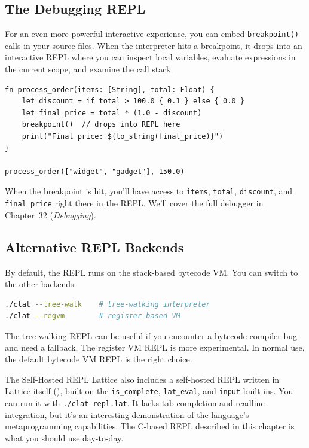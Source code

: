 \subsection{The Debugging REPL}\label{subsec:debug-repl}

For an even more powerful interactive experience, you can embed \lstinline|breakpoint()| calls in your source files.
When the interpreter hits a breakpoint, it drops into an interactive REPL where you can inspect local variables, evaluate expressions in the current scope, and examine the call stack.

\begin{lstlisting}[language=Lattice, caption={Using breakpoint() for in-context debugging}]
fn process_order(items: [String], total: Float) {
    let discount = if total > 100.0 { 0.1 } else { 0.0 }
    let final_price = total * (1.0 - discount)
    breakpoint()  // drops into REPL here
    print("Final price: ${to_string(final_price)}")
}

process_order(["widget", "gadget"], 150.0)
\end{lstlisting}

When the breakpoint is hit, you'll have access to \lstinline|items|, \lstinline|total|, \lstinline|discount|, and \lstinline|final_price| right there in the REPL\@.
We'll cover the full debugger in Chapter~32 (\emph{Debugging}).

\subsection{Alternative REPL Backends}\label{subsec:alt-repls}

By default, the REPL runs on the stack-based bytecode VM\@.
You can switch to the other backends:

\begin{lstlisting}[language=bash, numbers=none]
./clat --tree-walk    # tree-walking interpreter
./clat --regvm        # register-based VM
\end{lstlisting}

The tree-walking REPL can be useful if you encounter a bytecode compiler bug and need a fallback.
The register VM REPL is more experimental.
In normal use, the default bytecode VM REPL is the right choice.

\begin{warnbox}{The Self-Hosted REPL}
Lattice also includes a self-hosted REPL written in Lattice itself (), built on the \lstinline|is_complete|, \lstinline|lat_eval|, and \lstinline|input| built-ins.
You can run it with \lstinline|./clat repl.lat|.
It lacks tab completion and readline integration, but it's an interesting demonstration of the language's metaprogramming capabilities.
The C-based REPL described in this chapter is what you should use day-to-day.
\end{warnbox}

